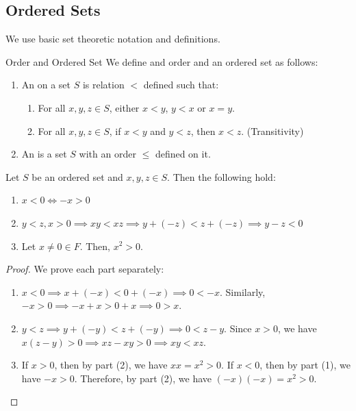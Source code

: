 \documentclass[openany]{book}
\begin{document}
\subsection{Ordered Sets}
We use basic set theoretic notation and definitions.
\begin{mydefinition}{Order and Ordered Set}
    We define and order and an ordered set as follows:
    \begin{enumerate}
    \item An  on a set $S$ is relation $<$ defined such that:
    \begin{enumerate}
        \item For all $x, y, z \in S$, either $x < y$, $y < x$ or $x = y$.
        \item For all $x, y, z \in S$, if $x < y$ and $y < z$, then $x < z$. (Transitivity)
    \end{enumerate}
    \item An  is a set $S$ with an order $\leq$ defined on it.
    \end{enumerate}
\end{mydefinition}
\begin{mytheorem}
    Let $S$ be an ordered set and $x, y, z \in S$. Then the following hold:
    \begin{enumerate}
        \item $x < 0 \iff -x > 0$
        \item $y < z, x > 0 \implies xy < xz \implies y + (-z) < z + (-z) \implies y - z < 0$
        \item Let $x \neq 0 \in F$. Then, $x^2 > 0$.
    \end{enumerate}
\end{mytheorem}
\begin{proof}
    We prove each part separately:
    \begin{enumerate}
        \item $x < 0 \implies x + (-x) < 0 + (-x) \implies 0 < -x$. Similarly, $-x > 0 \implies -x + x > 0 + x \implies 0 > x$.
        \item $y < z \implies y + (-y) < z + (-y) \implies 0 < z - y$. Since $x > 0$, we have $x(z - y) > 0 \implies xz - xy > 0 \implies xy < xz$.
        \item If $x > 0$, then by part (2), we have $xx = x^2 > 0$. If $x < 0$, then by part (1), we have $-x > 0$. Therefore, by part (2), we have $(-x)(-x) = x^2 > 0$.
    \end{enumerate}
\end{proof}
\end{document}
